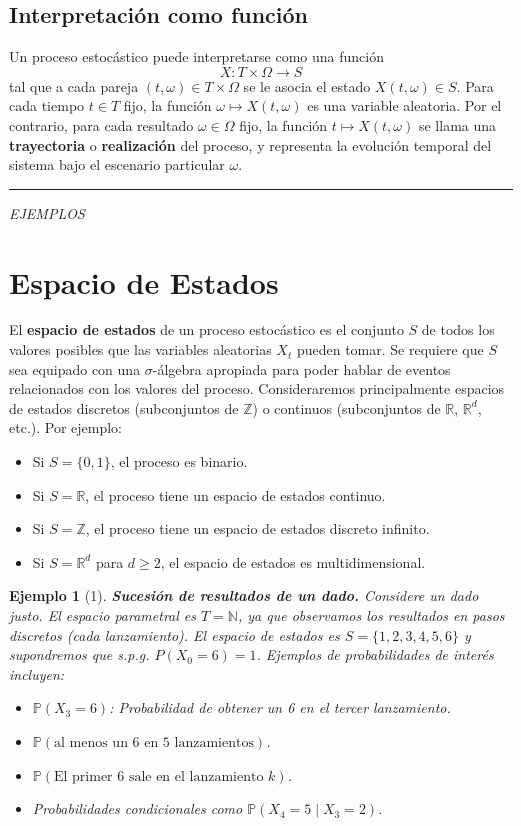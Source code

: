 \documentclass[12pt]{book}
\newtheorem{example}{Ejemplo}[chapter]
\begin{document}
\subsection*{Interpretación como función}

Un proceso estocástico puede interpretarse como una función
\[
X : T \times \Omega \to S
\]
tal que a cada pareja $(t, \omega) \in T \times \Omega$ se le asocia el estado $X(t, \omega) \in S$. Para cada tiempo $t \in T$ fijo, la función $\omega \mapsto X(t, \omega)$ es una variable aleatoria. Por el contrario, para cada resultado $\omega \in \Omega$ fijo, la función $t \mapsto X(t, \omega)$ se llama una \textbf{trayectoria} o \textbf{realización} del proceso, y representa la evolución temporal del sistema bajo el escenario particular $\omega$.

\vspace{10pt}
\hrule 
{\center \textit{EJEMPLOS} }

\section{Espacio de Estados}

El \textbf{espacio de estados} de un proceso estocástico es el conjunto $S$ de todos los valores posibles que las variables aleatorias $X_t$ pueden tomar. Se requiere que $S$ sea equipado con una $\sigma$-álgebra apropiada para poder hablar de eventos relacionados con los valores del proceso. Consideraremos principalmente espacios de estados discretos (subconjuntos de $\mathbb{Z}$) o continuos (subconjuntos de $\mathbb{R}$, $\mathbb{R}^d$, etc.). Por ejemplo:
\begin{itemize}
    \item Si $S = \{0, 1\}$, el proceso es binario.
    \item Si $S = \mathbb{R}$, el proceso tiene un espacio de estados continuo.
    \item Si $S = \mathbb{Z}$, el proceso tiene un espacio de estados discreto infinito.
    \item Si $S = \mathbb{R}^d$ para $d \geq 2$, el espacio de estados es multidimensional.
\end{itemize}

\begin{example}[1]
\textbf{Sucesión de resultados de un dado.} Considere un dado justo. El espacio parametral es $T = \mathbb{N}$, ya que observamos los resultados en pasos discretos (cada lanzamiento). El espacio de estados es $S = \{1, 2, 3, 4, 5, 6\}$ y supondremos que s.p.g. $P(X_0=6)=1$. Ejemplos de probabilidades de interés incluyen:
\begin{itemize}
    \item $\mathbb{P}(X_3 = 6)$: Probabilidad de obtener un 6 en el tercer lanzamiento.
    \item $\mathbb{P}( \text{al menos un 6 en 5 lanzamientos} )$.
    \item $\mathbb{P}( \text{El primer 6 sale en el lanzamiento } k )$.
    \item Probabilidades condicionales como $\mathbb{P}(X_4 = 5 \mid X_3 = 2)$.
\end{itemize}
\end{example}
\end{document}
